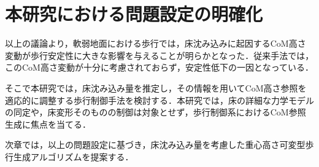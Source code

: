 \section{本研究における問題設定の明確化}

以上の議論より，軟弱地面における歩行では，床沈み込みに起因するCoM高さ変動が歩行安定性に大きな影響を与えることが明らかとなった．従来手法では，このCoM高さ変動が十分に考慮されておらず，安定性低下の一因となっている．

そこで本研究では，床沈み込み量を推定し，その情報を用いてCoM高さ参照を適応的に調整する歩行制御手法を検討する．本研究では，床の詳細な力学モデルの同定や，床変形そのものの制御は対象とせず，歩行制御系におけるCoM参照生成に焦点を当てる．

次章では，以上の問題設定に基づき，床沈み込み量を考慮した重心高さ可変型歩行生成アルゴリズムを提案する．